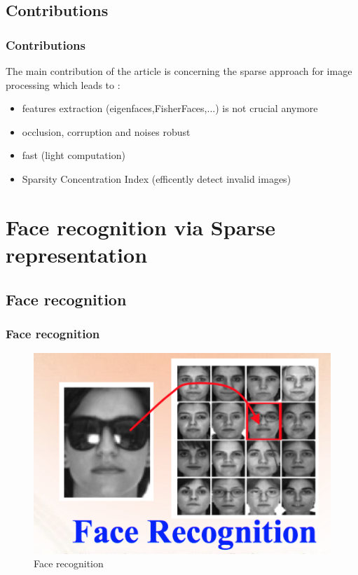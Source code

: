 \documentclass{beamer}
\begin{document}
			
	\subsection{Contributions}

	
	\begin{frame}
		\frametitle{Contributions}	
		

The main contribution of the article is concerning the sparse approach for image processing which leads to :
 	\begin{itemize}	
 	\item features extraction (eigenfaces,FisherFaces,...) is not crucial anymore 
 	\item occlusion, corruption and noises robust
 	\item fast (light computation)
 	\item Sparsity Concentration Index (efficently detect invalid images)	
	\end{itemize}
	
	\end{frame}
	


\section{Face recognition via Sparse representation}

	\subsection{Face recognition}
	
	
\begin{frame}
\frametitle{Face recognition}
			\begin{figure}[!ht]
			\begin{center}
			\includegraphics[scale=0.7]{face_recog.png}
			\end{center}
			\caption{Face recognition}
			\label{fa}
			\end{figure}
			

\end{frame}
\end{document}
